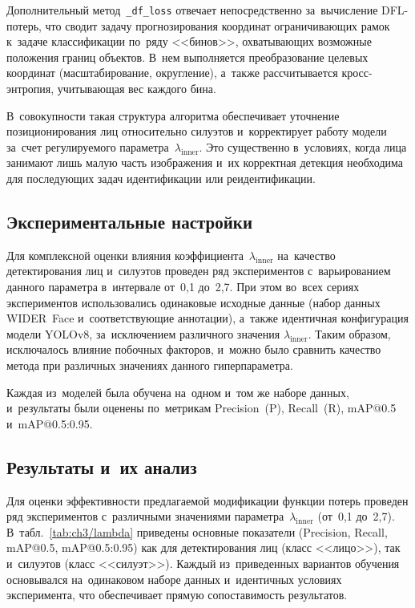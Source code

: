Дополнительный метод~\texttt{\_df\_loss} отвечает непосредственно
за~вычисление DFL-потерь, что сводит задачу прогнозирования координат
ограничивающих рамок к~задаче классификации по~ряду <<бинов>>,
охватывающих возможные положения границ объектов. В~нем выполняется
преобразование целевых координат (масштабирование, округление),
а~также рассчитывается кросс-энтропия, учитывающая вес каждого бина.

В~совокупности такая структура алгоритма обеспечивает уточнение
позиционирования лиц относительно силуэтов и~корректирует работу модели
за~счет регулируемого параметра~$\lambda_{\text{inner}}$. Это существенно в~условиях, когда лица занимают лишь малую часть изображения
и~их корректная детекция необходима для последующих задач
идентификации или реидентификации.

\subsection{Экспериментальные настройки}\label{sec:ch3/exp-setup}

Для комплексной оценки влияния коэффициента~$\lambda_{\text{inner}}$
на~качество детектирования лиц и~силуэтов проведен ряд экспериментов
с~варьированием данного параметра в~интервале от~0,1 до~2,7. При этом
во~всех сериях экспериментов использовались одинаковые исходные данные
(набор данных WIDER~Face и~соответствующие аннотации), а~также идентичная
конфигурация модели YOLOv8, за~исключением различного значения
$\lambda_{\text{inner}}$. Таким образом, исключалось влияние побочных
факторов, и~можно было сравнить качество метода при
различных значениях данного гиперпараметра.

Каждая из~моделей была обучена на~одном и~том же наборе данных,
и~результаты были оценены по~метрикам Precision~(P), Recall~(R),
mAP@0.5 и~mAP@0.5:0.95.

\subsection{Результаты и~их анализ}\label{sec:ch3/results}

Для оценки эффективности предлагаемой модификации функции потерь
проведен ряд экспериментов с~различными значениями
параметра~$\lambda_{\text{inner}}$ (от~0,1 до~2,7). В~табл.~\ref{tab:ch3/lambda}
приведены основные показатели (Precision, Recall, mAP@0.5,
mAP@0.5:0.95) как для детектирования лиц (класс <<лицо>>), так и~силуэтов
(класс <<силуэт>>). Каждый из~приведенных вариантов обучения
основывался на~одинаковом наборе данных и~идентичных условиях
эксперимента, что обеспечивает прямую сопоставимость результатов.


